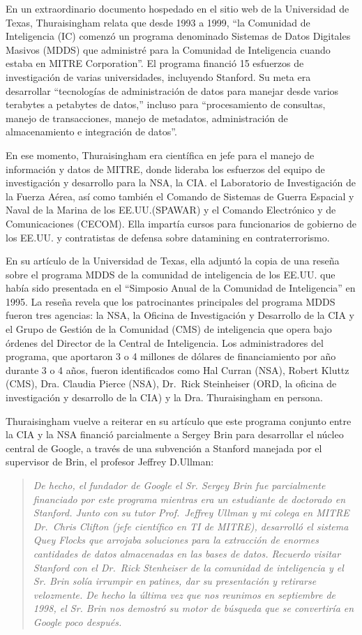 \documentclass[10pt,a5paper,twoside,spanish,]{book}
\begin{document}
En un extraordinario documento hospedado en el sitio web de la
Universidad de Texas, Thuraisingham relata que desde 1993 a 1999, ``la
Comunidad de Inteligencia (IC) comenzó un programa denominado Sistemas
de Datos Digitales Masivos (MDDS) que administré para la Comunidad de
Inteligencia cuando estaba en MITRE Corporation''. El programa financió
15 esfuerzos de investigación de varias universidades, incluyendo
Stanford. Su meta era desarrollar ``tecnologías de administración de
datos para manejar desde varios terabytes a petabytes de datos,''
incluso para ``procesamiento de consultas, manejo de transacciones,
manejo de metadatos, administración de almacenamiento e integración de
datos''.

En ese momento, Thuraisingham era científica en jefe para el manejo de
información y datos de MITRE, donde lideraba los esfuerzos del equipo de
investigación y desarrollo para la NSA, la CIA. el Laboratorio de
Investigación de la Fuerza Aérea, así como también el Comando de
Sistemas de Guerra Espacial y Naval de la Marina de los EE.UU.(SPAWAR) y
el Comando Electrónico y de Comunicaciones (CECOM). Ella impartía cursos
para funcionarios de gobierno de los EE.UU. y contratistas de defensa
sobre datamining en contraterrorismo.

En su artículo de la Universidad de Texas, ella adjuntó la copia de una
reseña sobre el programa MDDS de la comunidad de inteligencia de los
EE.UU. que había sido presentada en el ``Simposio Anual de la Comunidad
de Inteligencia'' en 1995. La reseña revela que los patrocinantes
principales del programa MDDS fueron tres agencias: la NSA, la Oficina
de Investigación y Desarrollo de la CIA y el Grupo de Gestión de la
Comunidad (CMS) de inteligencia que opera bajo órdenes del Director de
la Central de Inteligencia. Los administradores del programa, que
aportaron 3 o 4 millones de dólares de financiamiento por año durante 3
o 4 años, fueron identificados como Hal Curran (NSA), Robert Kluttz
(CMS), Dra. Claudia Pierce (NSA), Dr.~Rick Steinheiser (ORD, la oficina
de investigación y desarrollo de la CIA) y la Dra. Thuraisingham en
persona.

Thuraisingham vuelve a reiterar en su artículo que este programa
conjunto entre la CIA y la NSA financió parcialmente a Sergey Brin para
desarrollar el núcleo central de Google, a través de una subvención a
Stanford manejada por el supervisor de Brin, el profesor Jeffrey
D.Ullman:

\begin{quote}
\emph{De hecho, el fundador de Google el Sr. Sergey Brin fue
parcialmente financiado por este programa mientras era un estudiante de
doctorado en Stanford. Junto con su tutor Prof.~Jeffrey Ullman y mi
colega en MITRE Dr.~Chris Clifton (jefe científico en TI de MITRE),
desarrolló el sistema Quey Flocks que arrojaba soluciones para la
extracción de enormes cantidades de datos almacenadas en las bases de
datos. Recuerdo visitar Stanford con el Dr.~Rick Stenheiser de la
comunidad de inteligencia y el Sr. Brin solía irrumpir en patines, dar
su presentación y retirarse velozmente. De hecho la última vez que nos
reunimos en septiembre de 1998, el Sr. Brin nos demostró su motor de
búsqueda que se convertiría en Google poco después.}
\end{quote}
\end{document}
